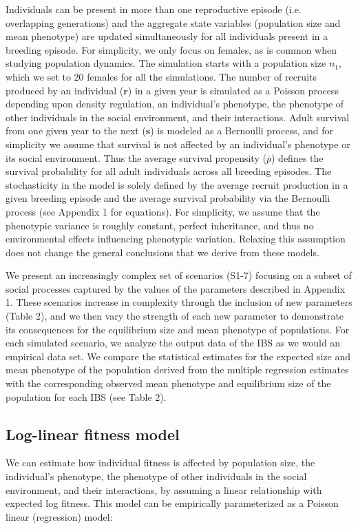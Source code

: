 \documentclass{article}
\begin{document}
	Individuals can be present in more than one reproductive episode (i.e. overlapping generations) and the aggregate state variables (population size and mean phenotype) are updated simultaneously for all individuals present in a breeding episode. For simplicity, we only focus on females, as is common when studying population dynamics. The simulation starts with a population size $n_{1}$, which we set to 20 females for all the simulations. The number of recruits produced by an individual ($\bm{r}$) in a given year is simulated as a Poisson process depending upon density regulation, an individual's phenotype, the phenotype of other individuals in the social environment, and their interactions. Adult survival from one given year to the next ($\bm{s}$) is modeled as a Bernoulli process, and for simplicity we assume that survival is not affected by an individual's phenotype or its social environment. Thus the average survival propensity ($\bar{p}$) defines the survival probability for all adult individuals across all breeding episodes. The stochasticity in the model is solely defined by the average recruit production in a given breeding episode and the average survival probability via the Bernoulli process (see Appendix 1 for equations). For simplicity, we assume that the phenotypic variance is roughly constant, perfect inheritance, and thus no environmental effects influencing phenotypic variation. Relaxing this assumption does not change the general conclusions that we derive from these models. 
	
	We present an increasingly complex set of scenarios (S1-7) focusing on a subset of social processes captured by the values of the parameters described in Appendix 1. These scenarios increase in complexity through the inclusion of new parameters (Table 2), and we then vary the strength of each new parameter to demonstrate its consequences for the equilibrium size and mean phenotype of populations. For each simulated scenario, we analyze the output data of the IBS as we would an empirical data set. We compare the statistical estimates for the expected size and mean phenotype of the population derived from the multiple regression estimates with the corresponding observed mean phenotype and equilibrium size of the population for each IBS (see Table 2). 
	
	\subsection{Log-linear fitness model}
	We can estimate how individual fitness is affected by population size, the individual's phenotype, the phenotype of other individuals in the social environment, and their interactions, by assuming a linear relationship with expected log fitness. This model can be empirically parameterized as a Poisson linear (regression) model: 
	
\end{document}
